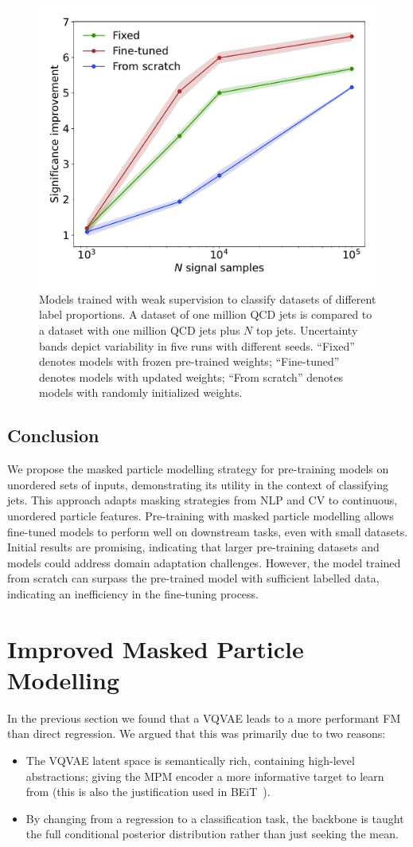 \begin{figure}[htp!]
    \centering
    \includegraphics[width=0.5\columnwidth]{Figures/foundation_models/mpm1/cwola_40M_0.pdf}
    \caption{
        Models trained with weak supervision to classify datasets of different label proportions.
        A dataset of one million QCD jets is compared to a dataset with one million QCD jets plus $N$ top jets. Uncertainty bands depict variability in five runs with different seeds.
        ``Fixed'' denotes models with frozen pre-trained weights; ``Fine-tuned'' denotes models with updated weights; ``From scratch'' denotes models with randomly initialized weights.}
    \label{fig:lp_ws}
\end{figure}

\subsection{Conclusion}

We propose the masked particle modelling strategy for pre-training models on unordered sets of inputs, demonstrating its utility in the context of classifying jets.
This approach adapts masking strategies from NLP and CV to continuous, unordered particle features.
Pre-training with masked particle modelling allows fine-tuned models to perform well on downstream tasks, even with small datasets.
Initial results are promising, indicating that larger pre-training datasets and models could address domain adaptation challenges.
However, the model trained from scratch can surpass the pre-trained model with sufficient labelled data, indicating an inefficiency in the fine-tuning process.

\section{Improved Masked Particle Modelling}

In the previous section we found that a VQVAE leads to a more performant FM than direct regression.
We argued that this was primarily due to two reasons:
\begin{itemize}
    \item The VQVAE latent space is semantically rich, containing high-level abstractions; giving the MPM encoder a more informative target to learn from (this is also the justification used in BEiT~\cite{BEIT}).
    \item By changing from a regression to a classification task, the backbone is taught the full conditional posterior distribution rather than just seeking the mean.
\end{itemize}


